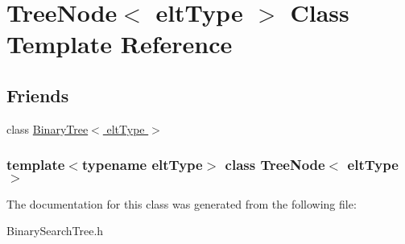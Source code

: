 \hypertarget{classTreeNode}{
\section{TreeNode$<$ eltType $>$ Class Template Reference}
\label{classTreeNode}
}
\subsection*{Friends}
\begin{DoxyCompactItemize}
\item 
\hypertarget{classTreeNode_a242cd44fb1555200321ae2ab92ec68a6}{
class \hyperlink{classTreeNode_a242cd44fb1555200321ae2ab92ec68a6}{BinaryTree$<$ eltType $>$}}
\label{classTreeNode_a242cd44fb1555200321ae2ab92ec68a6}

\end{DoxyCompactItemize}
\subsubsection*{template$<$typename eltType$>$ class TreeNode$<$ eltType $>$}



The documentation for this class was generated from the following file:\begin{DoxyCompactItemize}
\item 
BinarySearchTree.h\end{DoxyCompactItemize}
